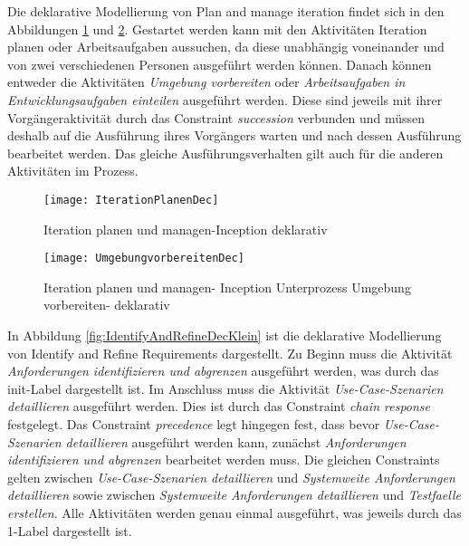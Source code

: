 Die deklarative Modellierung von Plan and manage iteration findet sich in den Abbildungen \ref{fig:IterationPlanenDec} und \ref{fig:UmgebungVorbereitenDec}. Gestartet werden kann mit den Aktivitäten {Iteration planen} oder {Arbeitsaufgaben aussuchen}, da diese unabhängig voneinander und von zwei verschiedenen Personen ausgeführt werden können.\newline
Danach können entweder die Aktivitäten \textit{Umgebung vorbereiten} oder \textit{Arbeitsaufgaben in Entwicklungsaufgaben einteilen} ausgeführt werden. Diese sind jeweils mit ihrer Vorgängeraktivität durch das Constraint \textit{succession} verbunden und müssen deshalb auf die Ausführung ihres Vorgängers warten und nach dessen Ausführung bearbeitet werden.\newline
Das gleiche Ausführungsverhalten gilt auch für die anderen Aktivitäten im Prozess. 



\begin{figure}[htp]
\begin{center}
  \texttt{[image: IterationPlanenDec]} %
  \caption{Iteration planen und managen-Inception deklarativ}
  \label{fig:IterationPlanenDec}
\end{center}
\end{figure}

\begin{figure}[htp]
\begin{center}
  \texttt{[image: UmgebungvorbereitenDec]} %
  \caption{Iteration planen und managen- Inception Unterprozess Umgebung vorbereiten- deklarativ}
  \label{fig:UmgebungVorbereitenDec}
\end{center}
\end{figure}


In Abbildung \ref{fig:IdentifyAndRefineDecKlein} ist die deklarative Modellierung von Identify and Refine Requirements dargestellt.\newline
Zu Beginn muss die Aktivität \textit{Anforderungen identifizieren und abgrenzen} ausgeführt werden, was durch das init-Label dargestellt ist. Im Anschluss muss die Aktivität \textit{Use-Case-Szenarien detaillieren} ausgeführt werden. Dies ist durch das Constraint \textit{chain response} festgelegt. Das Constraint \textit{precedence} legt hingegen fest, dass bevor \textit{Use-Case-Szenarien detaillieren} ausgeführt werden kann, zunächst \textit{Anforderungen identifizieren und abgrenzen}  bearbeitet werden muss. Die gleichen Constraints gelten zwischen \textit{Use-Case-Szenarien detaillieren} und \textit{Systemweite Anforderungen detaillieren} sowie zwischen \textit{Systemweite Anforderungen detaillieren} und \textit{Testfaelle erstellen}. Alle Aktivitäten werden genau einmal ausgeführt, was jeweils durch das 1-Label dargestellt ist. 

